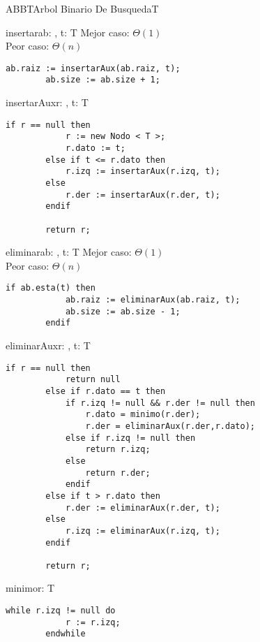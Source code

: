 \begin{module}{ABB}{T}{Arbol Binario De Busqueda}{T}
	\begin{proc}{insertar}{\Inout ab: \moduletype, \In t: T}{}
		Mejor caso: $\Theta(1)$ \\
		Peor caso: $\Theta(n)$
		\begin{lstlisting}[numbers=none,frame=none]
		ab.raiz := insertarAux(ab.raiz, t);
		ab.size := ab.size + 1;
		\end{lstlisting}
	\end{proc}

	\pagebreak

	\begin{proc}{insertarAux}{\Inout r: \nodo, \In t: T}{\nodo}
		\begin{lstlisting}[numbers=none,frame=none]
		if r == null then
			r := new Nodo < T >;
			r.dato := t;
		else if t <= r.dato then
			r.izq := insertarAux(r.izq, t);
		else
			r.der := insertarAux(r.der, t);
		endif

		return r;
		\end{lstlisting}
	\end{proc}

	\begin{proc}{eliminar}{\Inout ab: \moduletype, \In t: T}{}
		Mejor caso: $\Theta(1)$\\
		Peor caso: $\Theta(n)$
		\begin{lstlisting}[numbers=none,frame=none]
		if ab.esta(t) then
			ab.raiz := eliminarAux(ab.raiz, t);
			ab.size := ab.size - 1;
		endif
		\end{lstlisting}
	\end{proc}

	\begin{proc}{eliminarAux}{\Inout r: \nodo, \In t: T}{\nodo}
		\begin{lstlisting}[numbers=none,frame=none]
		if r == null then
			return null
		else if r.dato == t then
			if r.izq != null && r.der != null then
				r.dato = minimo(r.der);
				r.der = eliminarAux(r.der,r.dato);
			else if r.izq != null then
				return r.izq;
			else
				return r.der;
			endif
		else if t > r.dato then
			r.der := eliminarAux(r.der, t);
		else
			r.izq := eliminarAux(r.izq, t);
		endif

		return r;
		\end{lstlisting}
	\end{proc}

	\begin{proc}{minimo}{\In r: \nodo}{T}
		\begin{lstlisting}[numbers=none,frame=none]
		while r.izq != null do
			r := r.izq;
		endwhile


\end{lstlisting}
\end{proc}
\end{module}
